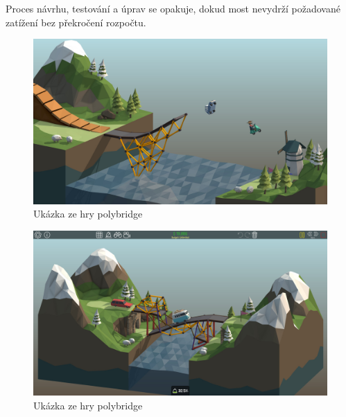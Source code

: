 Proces návrhu, testování a úprav se opakuje, dokud most nevydrží požadované zatížení bez překročení rozpočtu.


\begin{figure}[p]\centering
\includegraphics[width=140mm]{img/poly_screen_1.jpg}
\caption{Ukázka ze hry polybridge}
\label{fig:5}

\end{figure}

\begin{figure}[p]\centering
\includegraphics[width=140mm]{img/poly_screen_2.jpg}
\caption{Ukázka ze hry polybridge}
\label{fig:6}
\end{figure}



